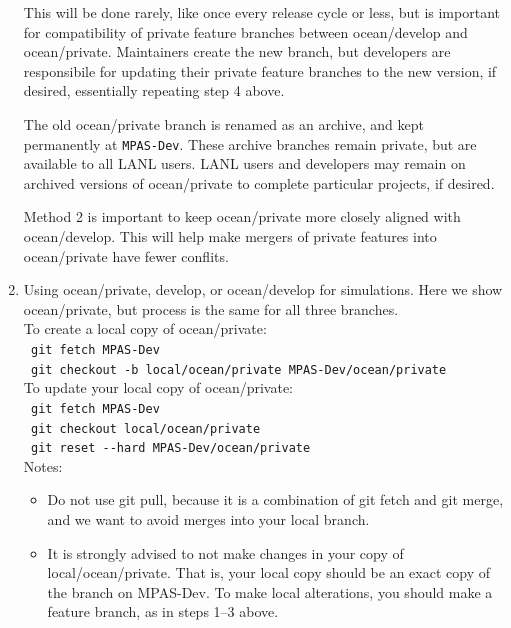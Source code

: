 \documentclass[11pt]{article}
\begin{document}
\begin{enumerate}
This will be done rarely, like once every release cycle or less, but is important for compatibility of private feature branches between ocean/develop and ocean/private.  Maintainers create the new branch, but developers are responsibile for updating their private feature branches to the new version, if desired, essentially repeating step 4 above.

The old ocean/private branch is renamed as an archive, and kept permanently at \verb|MPAS-Dev|.  These archive branches remain private, but are available to all LANL users.  LANL users and developers may remain on archived versions of ocean/private to complete particular projects, if desired.

Method 2 is important to keep ocean/private more closely aligned with ocean/develop.  This will help make mergers of private features into ocean/private have fewer conflits.

\clearpage

\item Using ocean/private, develop, or ocean/develop for simulations.  Here we show ocean/private, but process is the same for all three branches. \\

To create a local copy of ocean/private:\\
\verb| git fetch MPAS-Dev| \\
\verb| git checkout -b local/ocean/private MPAS-Dev/ocean/private | \\

To update your local copy of ocean/private:\\
\verb| git fetch MPAS-Dev| \\
\verb| git checkout local/ocean/private| \\
\verb| git reset --hard MPAS-Dev/ocean/private | \\


Notes: 
\begin{itemize}
\item Do not use git pull, because it is a combination of git fetch and git merge, and we want to avoid merges into your local branch.
\item It is strongly advised to not make changes in your copy of local/ocean/private.  That is, your local copy should be an exact copy of the branch on MPAS-Dev.  To make local alterations, you should make a feature branch, as in steps 1--3 above.
\end{itemize}

\end{enumerate}
\end{document}
